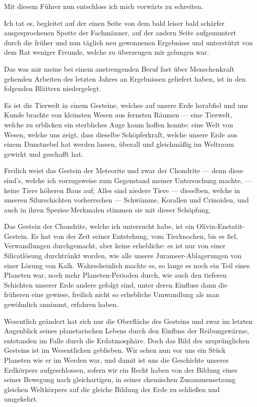 \documentclass[a4paper, 12pt, oneside]{article}
\begin{document}
Mit diesem Führer nun entschloss ich mich vorwärts zu schreiten.

Ich tat es, begleitet auf der einen Seite von dem bald leiser bald schärfer ausgesprochenen Spotte der Fachmänner, auf der andern Seite aufgemuntert durch die früher und nun täglich neu gewonnenen Ergebnisse und unterstützt von dem Rat weniger Freunde, welche zu überzeugen mir gelungen war.

Das was mir meine bei einem anstrengenden Beruf fast über Menschenkraft gehenden Arbeiten des letzten Jahres an Ergebnissen geliefert haben, ist in den folgenden Blättern niedergelegt.

Es ist die Tierwelt in einem Gesteine, welches auf unsere Erde herabfiel und uns Kunde brachte von kleinsten Wesen aus fernsten Räumen — eine Tierwelt, welche zu erblicken ein sterbliches Auge kaum hoffen konnte: eine Welt von Wesen, welche uns zeigt, dass dieselbe Schöpferkraft, welche unsere Erde aus einem Dunstnebel hat werden lassen, überall und gleichmäßig im Weltraum gewirkt und geschafft hat.

Freilich weist das Gestein der Meteorite und zwar der Chondrite — denn diese sind's, welche ich vorzugsweise zum Gegenstand meiner Untersuchung machte, — keine Tiere höheren Baus auf; Alles sind niedere Tiere — dieselben, welche in unseren Silurschichten vorherrschen — Schwämme, Korallen und Crinoiden, und auch in ihren Spezies-Merkmalen stimmen sie mit dieser Schöpfung.

Das Gestein der Chondrite, welche ich untersucht habe, ist ein Olivin-Enstatit-Gestein. Es hat von der Zeit seiner Entstehung, vom Tierknochen, bis es fiel, Verwandlungen durchgemacht, aber keine erhebliche: es ist nur von einer Silicatlösung durchtränkt worden, wie alle unsere Jurameer-Ablagerungen von einer Lösung von Kalk. Wahrscheinlich machte es, so lange es noch ein Teil eines Planeten war, noch mehr Planeten-Perioden durch, wie auch den tieferen Schichten unserer Erde andere gefolgt sind, unter deren Einfluss dann die früheren eine gewisse, freilich nicht so erhebliche Umwandlung als man gewöhnlich annimmt, erfahren haben.

Wesentlich geändert hat sich nur die Oberfläche des Gesteins und zwar im letzten Augenblick seines planetarischen Lebens durch den Einfluss der Reibungswärme, entstanden im Falle durch die Erdatmosphäre. Doch das Bild des ursprünglichen Gesteins ist im Wesentlichen geblieben. Wir sehen nun vor uns ein Stück Planeten wie er im Werden war, und damit ist uns die Geschichte unseres Erdkörpers aufgeschlossen, sofern wir ein Recht haben von der Bildung eines seiner Bewegung nach gleichartigen, in seiner chemischen Zusammensetzung gleichen Weltkörpers auf die gleiche Bildung der Erde zu schließen und umgekehrt.
\end{document}
